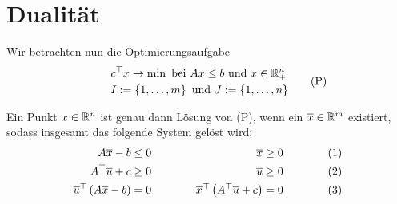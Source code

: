 \section{Dualität}

Wir betrachten nun die Optimierungsaufgabe
\begin{equation*}
	\begin{aligned}
		\qquad &c^{\top} x \to \min \text{ bei } Ax \le b \text{ und } x \in \mathbb{R}^n_+ \\
		&I \mathrel{:=} \left\{ 1, \dots, m \right\} \text{ und } J \mathrel{:=} \left\{ 1, \dots, n \right\}
	\end{aligned} \tag{P}
	\label{eq: P}
\end{equation*}

\begin{satz}[Charakterisierungssatz] %
	\label{satz: 3.9}
	Ein Punkt $x \in \mathbb{R}^n$ ist genau dann Lösung von (P), wenn ein $\overline{x} \in \mathbb{R}^m$ existiert, sodass insgesamt das folgende System gelöst wird:
	\begin{equation*}
		\begin{alignedat}{3}
			A \overline{x} - b &\le 0 \quad &\overline{x} &\ge 0 \qquad \qquad &(1) \\
			A^{\top} \overline{u} + c &\ge 0 \quad &\overline{u} &\ge 0 &(2) \\
			\overline{u}^{\top} \left( A \overline{x} - b \right) &= 0 \qquad \qquad &\overline{x}^{\top} \left( A^{\top}\overline{u} + c \right) &= 0 &(3)
		\end{alignedat}
	\end{equation*}
\end{satz}
